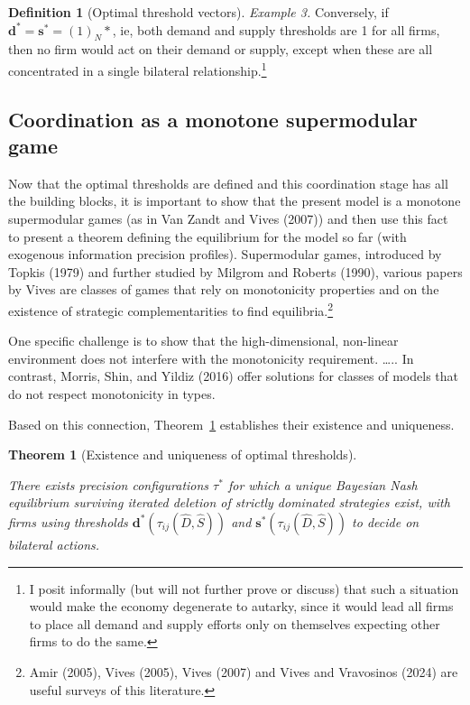 \documentclass[
]{article}
\theoremstyle{plain}
\newtheorem{theorem}{Theorem}[section]
\theoremstyle{definition}
\newtheorem{definition}{Definition}[section]
\theoremstyle{remark}
\begin{document}
\begin{definition}[Optimal threshold
vectors]
\emph{Example 3.} Conversely, if
\(\mathbf{d}^* = \mathbf{s}^* = (1)_N*\), ie, both demand and supply
thresholds are 1 for all firms, then no firm would act on their demand
or supply, except when these are all concentrated in a single bilateral
relationship.\footnote{I posit informally (but will not further prove or
  discuss) that such a situation would make the economy degenerate to
  autarky, since it would lead all firms to place all demand and supply
  efforts only on themselves expecting other firms to do the same.}

\end{definition}

\subsection{Coordination as a monotone supermodular
game}\label{coordination-as-a-monotone-supermodular-game}

Now that the optimal thresholds are defined and this coordination stage
has all the building blocks, it is important to show that the present
model is a monotone supermodular games (as in Van Zandt and Vives
(2007)) and then use this fact to present a theorem defining the
equilibrium for the model so far (with exogenous information precision
profiles). Supermodular games, introduced by Topkis (1979) and further
studied by Milgrom and Roberts (1990), various papers by Vives are
classes of games that rely on monotonicity properties and on the
existence of strategic complementarities to find equilibria.\footnote{Amir
  (2005), Vives (2005), Vives (2007) and Vives and Vravosinos (2024) are
  useful surveys of this literature.}

One specific challenge is to show that the high-dimensional, non-linear
environment does not interfere with the monotonicity requirement.
\ldots.. In contrast, Morris, Shin, and Yildiz (2016) offer solutions
for classes of models that do not respect monotonicity in types.

Based on this connection, Theorem~\ref{thm-optmthresh} establishes their
existence and uniqueness.

\begin{theorem}[Existence and uniqueness of optimal
thresholds]\protect\hypertarget{thm-optmthresh}{}\label{thm-optmthresh}

There exists precision configurations \(\tau^*\) for which a unique
Bayesian Nash equilibrium surviving iterated deletion of strictly
dominated strategies exist, with firms using thresholds
\(\mathbf{d}^*(\tau_{ij}(\hat{D}, \hat{S}))\) and
\(\mathbf{s}^*(\tau_{ij}(\hat{D}, \hat{S}))\) to decide on bilateral
actions.

\end{theorem}
\end{document}
